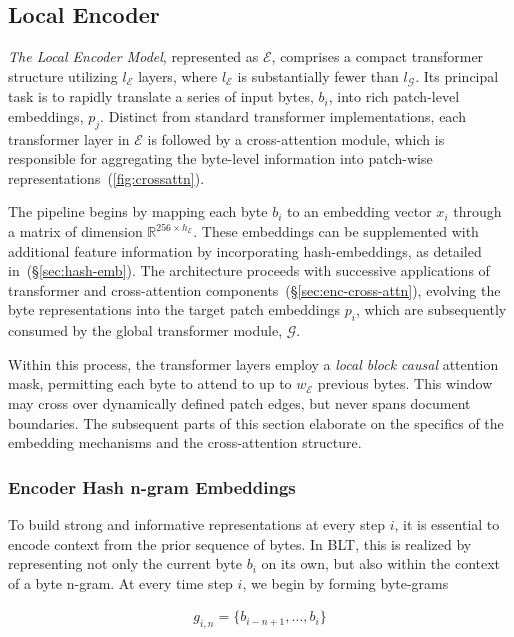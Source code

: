 \subsection{Local Encoder}
\label{section:local}

\textit{The Local Encoder Model}, represented as $\mathcal{E}$, comprises a compact transformer structure utilizing $l_{\mathcal{E}}$ layers, where $l_{\mathcal{E}}$ is substantially fewer than $l_{\mathcal{G}}$. Its principal task is to rapidly translate a series of input bytes, $b_i$, into rich patch-level embeddings, $p_j$. Distinct from standard transformer implementations, each transformer layer in $\mathcal{E}$ is followed by a cross-attention module, which is responsible for aggregating the byte-level information into patch-wise representations~(\autoref{fig:crossattn}).

The pipeline begins by mapping each byte $b_i$ to an embedding vector $x_i$ through a matrix of dimension $\mathbb{R}^{256 \times h_{\mathcal{E}}}$. These embeddings can be supplemented with additional feature information by incorporating hash-embeddings, as detailed in~(\S\ref{sec:hash-emb}). The architecture proceeds with successive applications of transformer and cross-attention components~(\S\ref{sec:enc-cross-attn}), evolving the byte representations into the target patch embeddings $p_i$, which are subsequently consumed by the global transformer module, $\mathcal{G}$.

Within this process, the transformer layers employ a \textit{local block causal} attention mask, permitting each byte to attend to up to $w_{\mathcal{E}}$ previous bytes. This window may cross over dynamically defined patch edges, but never spans document boundaries. The subsequent parts of this section elaborate on the specifics of the embedding mechanisms and the cross-attention structure.

\subsubsection{Encoder Hash n-gram Embeddings}
\label{sec:ngram-emb}
\label{sec:hash-emb}
To build strong and informative representations at every step $i$, it is essential to encode context from the prior sequence of bytes. In {\textsc BLT}, this is realized by representing not only the current byte $b_i$ on its own, but also within the context of a byte n-gram. At every time step $i$, we begin by forming byte-grams

\begin{align}
    g_{i,n}=\{b_{i-n + 1},\ldots, b_i\}
\end{align}

